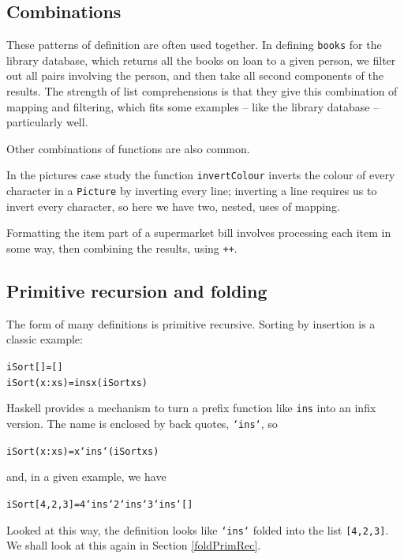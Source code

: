 \subsection*{Combinations}

These patterns of definition are often used together. In defining 
\texttt{books} for the library database, which returns all the books on loan to a
given person, we filter out all pairs involving the person, and then take all
second components of the results. The strength of list comprehensions is that
they give this combination of mapping and filtering,
which fits some examples -- like the library database -- particularly well.

Other combinations of functions are also common.
\begin{titemize}
\item In the pictures case study the function \texttt{invertColour} 
inverts the colour of every character in a \texttt{Picture} 
by inverting every line; inverting a line requires us to invert every character, 
so here we have two, 
nested, uses of mapping.
\item Formatting the item part of a supermarket bill involves processing each
item in some way, then combining the results, using \texttt{++}.
\end{titemize}

\subsection*{Primitive recursion and folding}

The form of many definitions is primitive recursive. Sorting by
insertion is a classic example:
\begin{alltt}
iSort []     = []
iSort (x:xs) = ins x (iSort xs)
\end{alltt}
Haskell provides a mechanism to turn a prefix function like \texttt{ins}
into an infix
version. The name is enclosed by back quotes, \texttt{`ins`}, so
\begin{alltt}
iSort (x:xs) = x `ins` (iSort xs)
\end{alltt}
and, in a given example, we have
\begin{alltt}
iSort [4,2,3] = 4 `ins` 2 `ins` 3 `ins` []
\end{alltt}
Looked at this way, the definition looks like \texttt{`ins`} folded into the
list \texttt{[4,2,3]}. We shall look at this again in Section \ref{foldPrimRec}. 


